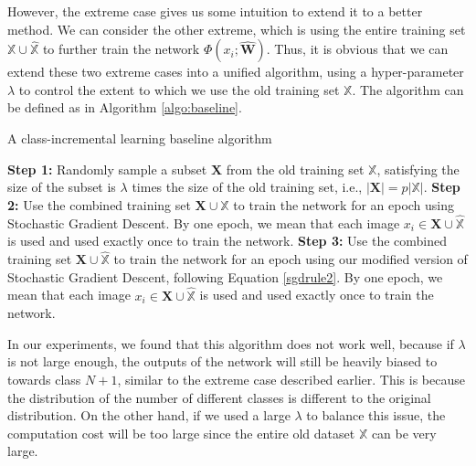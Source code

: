 However, the extreme case gives us some intuition to extend it to a better method. We can consider the other extreme, which is using the entire training set $\mathbb{X}\cup \hat{\mathbb{X}}$ to further train the network $\Phi(x_i; \hat{\mathbf{W}})$. Thus, it is obvious that we can extend these two extreme cases into a unified algorithm, using a hyper-parameter $\lambda$ to control the extent to which we use the old training set $\mathbb{X}$. The algorithm can be defined as in Algorithm \ref{algo:baseline}.


\begin{algorithm}
	\caption{A class-incremental learning baseline algorithm}
	\label{algo:baseline}
	\begin{algorithmic}
		\State \textbf{Step 1:} Randomly sample a subset $\mathbf{X}$ from the old training set $\mathbb{X}$, satisfying the size of the subset is $\lambda$ times the size of the old training set, i.e., $|\mathbf{X}| = p|\mathbb{X}|$.
		\State \textbf{Step 2:} Use the combined training set $\mathbf{X} \cup \hat{\mathbb{X}}$ to train the network for an epoch using Stochastic Gradient Descent. By one epoch, we mean that each image $x_i \in \mathbf{X} \cup \hat{\mathbb{X}}$ is used and used exactly once to train the network.
		\State \textbf{Step 3:} Use the combined training set $\mathbf{X} \cup \hat{\mathbb{X}}$ to train the network for an epoch using our modified version of Stochastic Gradient Descent, following Equation \ref{sgdrule2}. By one epoch, we mean that each image $x_i \in \mathbf{X} \cup \hat{\mathbb{X}}$ is used and used exactly once to train the network.
		\EndFor
	\end{algorithmic}
\end{algorithm}

In our experiments, we found that this algorithm does not work well, because if $\lambda$ is not large enough, the outputs of the network will still be heavily biased to towards class $N+1$, similar to the extreme case described earlier. This is because the distribution of the number of different classes is different to the original distribution. On the other hand, if we used a large $\lambda$ to balance this issue, the computation cost will be too large since the entire old dataset $\mathbb{X}$ can be very large.

